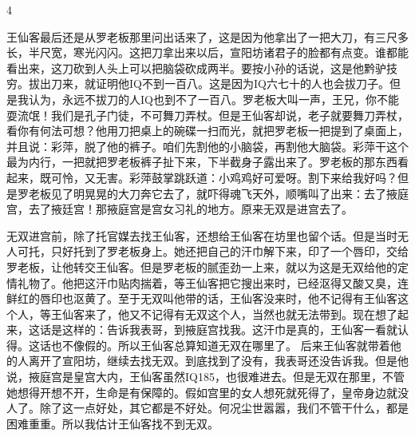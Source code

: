 4 

王仙客最后还是从罗老板那里问出话来了，这是因为他拿出了一把大刀，有三尺多长，半尺宽，寒光闪闪。这把刀拿出来以后，宣阳坊诸君子的脸都有点变。谁都能看出来，这刀砍到人头上可以把脑袋砍成两半。要按小孙的话说，这是他黔驴技穷。拔出刀来，就证明他IQ不到一百八。这是因为IQ六七十的人也会拔刀子。但是我认为，永远不拔刀的人IQ也到不了一百八。罗老板大叫一声，王兄，你不能耍流氓！我们是孔子门徒，不可舞刀弄杖。但是王仙客却说，老子就要舞刀弄杖，看你有何法可想？他用刀把桌上的碗碟一扫而光，就把罗老板一把提到了桌面上，并且说：彩萍，脱了他的裤子。咱们先割他的小脑袋，再割他大脑袋。彩萍干这个最为内行，一把就把罗老板裤子扯下来，下半截身子露出来了。罗老板的那东西看起来，既可怜，又无害。彩萍鼓掌跳跃道：小鸡鸡好可爱呀。割下来给我好吗？但是罗老板见了明晃晃的大刀奔它去了，就吓得魂飞天外，顺嘴叫了出来：去了掖庭宫，去了掖廷宫！那掖庭宫是宫女习礼的地方。原来无双是进宫去了。 

无双进宫前，除了托官媒去找王仙客，还想给王仙客在坊里也留个话。但是当时无人可托，只好托到了罗老板身上。她还把自己的汗巾解下来，印了一个唇印，交给罗老板，让他转交王仙客。但是罗老板的腻歪劲一上来，就以为这是无双给他的定情礼物了。他把这汗巾贴肉揣着，等王仙客把它搜出来时，已经沤得又酸又臭，连鲜红的唇印也沤黄了。至于无双叫他带的话，王仙客没来时，他不记得有王仙客这个人，等王仙客来了，他又不记得有无双这个人，当然也就无法带到。现在想了起来，这话是这样的：告诉我表哥，到掖庭宫找我。这汗巾是真的，王仙客一看就认得。这话也不像假的。所以王仙客总算知道无双在哪里了。 后来王仙客就带着他的人离开了宣阳坊，继续去找无双。到底找到了没有，我表哥还没告诉我。但是他说，掖庭宫是皇宫大内，王仙客虽然IQ185，也很难进去。但是无双在那里，不管她想得开想不开，生命是有保障的。假如宫里的女人想死就死得了，皇帝身边就没人了。除了这一点好处，其它都是不好处。何况尘世嚣嚣，我们不管干什么，都是困难重重。所以我估计王仙客找不到无双。
